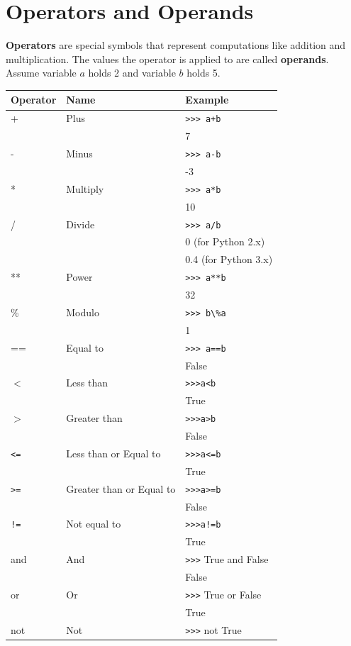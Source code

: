 \documentclass[10pt]{book}
\begin{document}
{\section{Operators and Operands}
{\bf Operators} are special symbols that represent computations like addition and multiplication.  The values the operator is applied to are called {\bf operands}. Assume variable $a$ holds 2 and variable $b$ holds 5.

\begin{tabular}{lll}
\toprule
Operator & Name & Example \\
\midrule
+ & Plus & \verb">>> a+b" \\
  &      & 7 \\
- & Minus & \verb">>> a-b" \\
  &      & -3 \\
* & Multiply & \verb">>> a*b" \\
  &      & 10 \\
/ & Divide & \verb">>> a/b" \\
  &      & 0 (for Python 2.x) \\
  &      & 0.4 (for Python 3.x) \\
** & Power & \verb">>> a**b" \\
  &      & 32 \\
\% & Modulo & \verb">>> b\%a" \\
  &      & 1 \\
== & Equal to & \verb">>> a==b" \\
  &      & False \\
$<$ & Less than & \verb">>>a<b" \\
  &      & True \\
$>$ & Greater than & \verb">>>a>b" \\
  &      & False \\
\verb"<=" & Less than or Equal to & \verb">>>a<=b" \\
  &      & True \\
\verb">=" & Greater than or Equal to& \verb">>>a>=b" \\
  &      & False \\
\verb"!=" & Not equal to & \verb">>>a!=b" \\
  &      & True \\
and & And & \verb">>>" True and False \\
  &      & False \\
or & Or & \verb">>>" True or False \\
  &      & True \\
not & Not & \verb">>>" not True \\

\end{tabular}}
\end{document}
